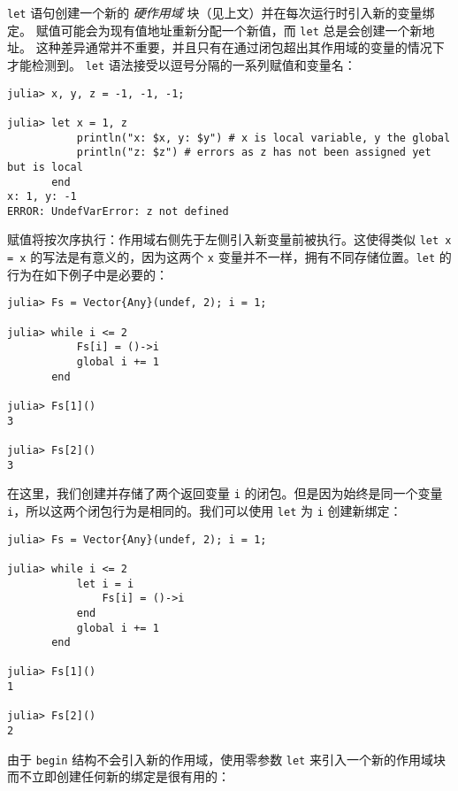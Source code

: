\texttt{let} 语句创建一个新的 \emph{硬作用域} 块（见上文）并在每次运行时引入新的变量绑定。 赋值可能会为现有值地址重新分配一个新值，而 \texttt{let} 总是会创建一个新地址。 这种差异通常并不重要，并且只有在通过闭包超出其作用域的变量的情况下才能检测到。 \texttt{let} 语法接受以逗号分隔的一系列赋值和变量名：




\begin{verbatim}
julia> x, y, z = -1, -1, -1;

julia> let x = 1, z
           println("x: $x, y: $y") # x is local variable, y the global
           println("z: $z") # errors as z has not been assigned yet but is local
       end
x: 1, y: -1
ERROR: UndefVarError: z not defined
\end{verbatim}



赋值将按次序执行：作用域右侧先于左侧引入新变量前被执行。这使得类似 \texttt{let x = x} 的写法是有意义的，因为这两个 \texttt{x} 变量并不一样，拥有不同存储位置。\texttt{let} 的行为在如下例子中是必要的：




\begin{verbatim}
julia> Fs = Vector{Any}(undef, 2); i = 1;

julia> while i <= 2
           Fs[i] = ()->i
           global i += 1
       end

julia> Fs[1]()
3

julia> Fs[2]()
3
\end{verbatim}



在这里，我们创建并存储了两个返回变量 \texttt{i} 的闭包。但是因为始终是同一个变量\texttt{i}，所以这两个闭包行为是相同的。我们可以使用 \texttt{let} 为 \texttt{i} 创建新绑定：




\begin{verbatim}
julia> Fs = Vector{Any}(undef, 2); i = 1;

julia> while i <= 2
           let i = i
               Fs[i] = ()->i
           end
           global i += 1
       end

julia> Fs[1]()
1

julia> Fs[2]()
2
\end{verbatim}



由于 \texttt{begin} 结构不会引入新的作用域，使用零参数 \texttt{let} 来引入一个新的作用域块而不立即创建任何新的绑定是很有用的：




